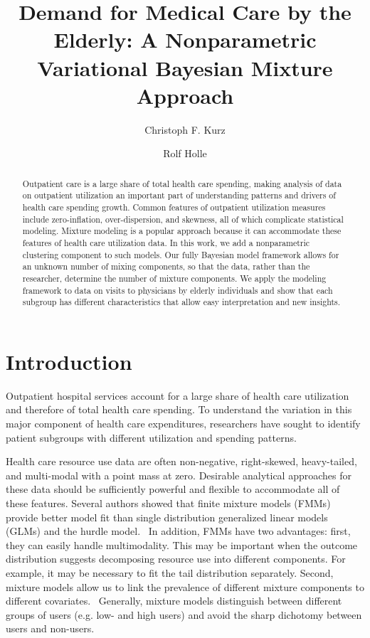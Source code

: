 \documentclass[a4paper,UKenglish]{oasics-v2016}
\title{Demand for Medical Care by the Elderly: A Nonparametric Variational Bayesian Mixture	Approach}
\author[1]{Christoph F. Kurz}
\author[1]{Rolf Holle}
\affil[1]{Helmholtz Zentrum M\"unchen,\\
  Institute of Health Economics and Health Care Management, Neuherberg, Germany\\
  \texttt{christoph.kurz@helmholtz-muenchen.de}}
\begin{document}
\maketitle

\begin{abstract}
Outpatient care is a large share of total health care spending, making analysis of data on outpatient utilization an important part of understanding patterns and drivers of health care spending growth. Common features of outpatient utilization measures include zero-inflation, over-dispersion, and skewness, all of which complicate statistical modeling. Mixture modeling is a popular approach because it can accommodate these features of health care utilization data. In this work, we add a nonparametric clustering component to such models. Our fully Bayesian model framework allows for an unknown number of mixing components, so that the data, rather than the researcher, determine the number of mixture components. We apply the modeling framework to data on visits to physicians by elderly individuals and show that each subgroup has different characteristics that allow easy interpretation and new insights.
\end{abstract}

\section{Introduction}
Outpatient hospital services account for a large share of health care utilization and therefore of total health care spending. To understand the variation in this major component of health care expenditures, researchers have sought to identify patient subgroups with different utilization and spending patterns.

Health care resource use data are often non-negative, right-skewed, heavy-tailed, and multi-modal with a point mass at zero. Desirable analytical approaches for these data should be sufficiently powerful and flexible to accommodate all of these features.
Several authors showed that finite mixture models (FMMs) provide better model fit than single distribution generalized linear models (GLMs) and the hurdle model.~\cite{DebTrivedi, mihaylova} In addition, FMMs have two advantages: first,
they can easily handle multimodality. This may be important when the outcome distribution suggests decomposing resource use into different components.
For example, it may be necessary to fit the tail distribution separately. Second, mixture models allow us to link the prevalence of different mixture components to different covariates.~\cite{mihaylova} Generally, mixture models distinguish between different groups of users (e.g. low- and high users) and avoid the sharp dichotomy between users and non-users.
\end{document}
